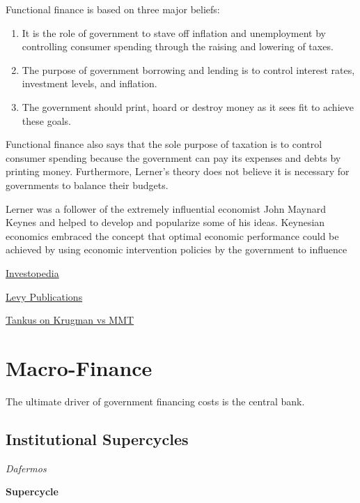\documentclass[
]{book}
\providecommand{\tightlist}{%
  \setlength{\itemsep}{0pt}\setlength{\parskip}{0pt}}
\begin{document}
Functional finance is based on three major beliefs:

\begin{enumerate}
\def\labelenumi{\arabic{enumi}.}
\tightlist
\item
  It is the role of government to stave off inflation and unemployment by controlling consumer spending through the raising and lowering of taxes.
\item
  The purpose of government borrowing and lending is to control interest rates, investment levels, and inflation.
\item
  The government should print, hoard or destroy money as it sees fit to achieve these goals.
\end{enumerate}

Functional finance also says that the sole purpose of taxation is to control consumer spending because the government can pay its expenses and debts by printing money. Furthermore, Lerner's theory does not believe it is necessary for governments to balance their budgets.

Lerner was a follower of the extremely influential economist John Maynard Keynes and helped to develop and popularize some of his ideas. Keynesian economics embraced the concept that optimal economic performance could be achieved by using economic intervention policies by the government to influence

\href{https://www.investopedia.com/terms/f/functional-finance.asp}{Investopedia}

\href{http://www.levyinstitute.org/topics/functional-finance}{Levy Publications}

\href{https://www.crisesnotes.com/paul-krugman-functional-finance-flip-flop/}{Tankus on Krugman vs MMT}

\hypertarget{macro-finance}{%
\chapter{Macro-Finance}\label{macro-finance}}

The ultimate driver of government financing costs is the central bank.

\hypertarget{institutional-supercycles}{%
\section{Institutional Supercycles}\label{institutional-supercycles}}

\emph{Dafermos}

\textbf{Supercycle}
\end{document}
